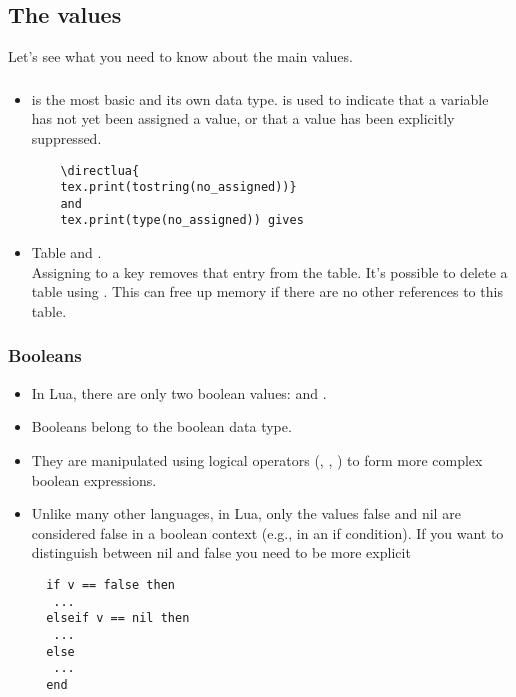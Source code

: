 \subsection{The values}

Let's see what you need to know about the main values.


\subsubsection{}


  \begin{itemize}

    \item   {} is the most basic and its own data type.  is used to indicate that a variable has not yet been assigned a value, or that a value has been explicitly suppressed.

\begin{mybox}
  \begin{verbatim}
    \directlua{
    tex.print(tostring(no_assigned))}
    and
    tex.print(type(no_assigned)) gives
  \end{verbatim}
\end{mybox}

\item Table and .\\

Assigning  to a key removes that entry from the table. It's possible to delete a table using . This can free up memory if there are no other references to this table.

  \end{itemize}

\subsubsection{Booleans}

\begin{itemize}
  \item In Lua, there are only two boolean values:  and .
  \item Booleans belong to the boolean data type.
  \item They are manipulated using logical operators (, , ) to form more complex boolean expressions.
  \item Unlike many other languages, in Lua, only the values false and nil are considered false in a boolean context (e.g., in an if condition).
  If you want to distinguish between nil and false you need to be more explicit
\begin{mybox}
\begin{verbatim}
  if v == false then
   ...
  elseif v == nil then
   ...
  else
   ...
  end
\end{verbatim}
\end{mybox}
\end{itemize}

